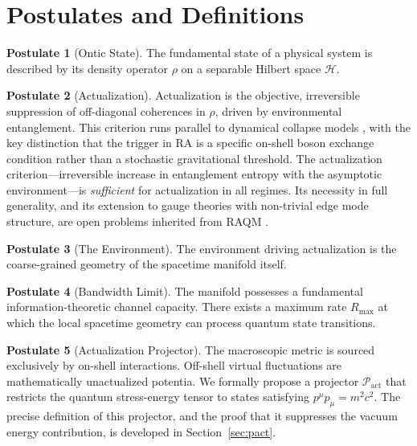 \documentclass[11pt,a4paper]{article}
\theoremstyle{plain}
\theoremstyle{definition}
\newtheorem{postulate}{Postulate}
\theoremstyle{remark}
\newcommand{\Pact}{\mathcal{P}_{\mathrm{act}}}
\newcommand{\Rmax}{R_{\mathrm{max}}}
\begin{document}
\section{Postulates and Definitions}
\label{sec:postulates}

\begin{postulate}[Ontic State]
The fundamental state of a physical system is described by its density operator
$\rho$ on a separable Hilbert space $\mathcal{H}$.
\end{postulate}

\begin{postulate}[Actualization]
Actualization is the objective, irreversible suppression of off-diagonal coherences
in $\rho$, driven by environmental entanglement. This criterion runs parallel to
dynamical collapse models \citep{Bassi2013}, with the key distinction that the
trigger in RA is a specific on-shell boson exchange condition rather than a
stochastic gravitational threshold. The actualization criterion---irreversible
increase in entanglement entropy with the asymptotic environment---is
\emph{sufficient} for actualization in all regimes. Its necessity in full
generality, and its extension to gauge theories with non-trivial edge mode
structure, are open problems inherited from RAQM \citep{Sandeman2026a}.
\end{postulate}

\begin{postulate}[The Environment]
The environment driving actualization is the coarse-grained geometry of the
spacetime manifold itself.
\end{postulate}

\begin{postulate}[Bandwidth Limit]
The manifold possesses a fundamental information-theoretic channel capacity.
There exists a maximum rate $\Rmax$ at which the local spacetime geometry can
process quantum state transitions.
\end{postulate}

\begin{postulate}[Actualization Projector]
The macroscopic metric is sourced exclusively by on-shell interactions. Off-shell
virtual fluctuations are mathematically unactualized potentia. We formally propose
a projector $\Pact$ that restricts the quantum stress-energy tensor to states
satisfying $p^{\mu}p_{\mu} = m^{2}c^{2}$. The precise definition of this
projector, and the proof that it suppresses the vacuum energy contribution, is
developed in Section~\ref{sec:pact}.
\end{postulate}
\end{document}
